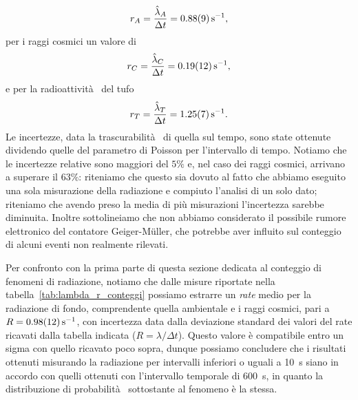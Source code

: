 \documentclass[10pt,oneside,a4paper]{article}
\begin{document}
\[
r_A = \frac{\hat{\lambda}_A}{\Delta t} = \SI{0.88 \pm 0.09}{s^{-1}},
\] 
per i raggi cosmici un valore di
\[
r_C = \frac{\hat{\lambda}_C}{\Delta t} = \SI{0.19 \pm 0.12}{s^{-1}},
\]
e per la radioattività  del tufo
\[
r_T = \frac{\hat{\lambda}_T}{\Delta t} = \SI{1.25 \pm 0.07}{s^{-1}}.
\]
Le incertezze, data la trascurabilità  di quella sul tempo, sono state ottenute dividendo quelle del parametro di Poisson per l'intervallo di tempo.
Notiamo che le incertezze relative sono maggiori del $5\%$ e, nel caso dei raggi cosmici, arrivano a superare il $63\%$: riteniamo che questo sia dovuto al fatto che abbiamo eseguito una sola misurazione della radiazione e compiuto l'analisi di un solo dato; riteniamo che avendo preso la media di più misurazioni l'incertezza sarebbe diminuita. Inoltre sottolineiamo che non abbiamo considerato il possibile rumore elettronico del contatore Geiger-M\"uller, che potrebbe aver influito sul conteggio di alcuni eventi non realmente rilevati.

Per confronto con la prima parte di questa sezione dedicata al conteggio di fenomeni di radiazione, notiamo che dalle misure riportate nella tabella~\ref{tab:lambda_r_conteggi} possiamo estrarre un \emph{rate} medio per la radiazione di fondo, comprendente quella ambientale e i raggi cosmici, pari a $R = \SI{0.98 \pm 0.12}{s^{-1}}$, con incertezza data dalla deviazione standard dei valori del rate ricavati dalla tabella indicata ($R = \lambda / \Delta t$). Questo valore è compatibile entro un sigma con quello ricavato poco sopra, dunque possiamo concludere che i risultati ottenuti misurando la radiazione per intervalli inferiori o uguali a \SI{10}{s} siano in accordo con quelli ottenuti con l'intervallo temporale di \SI{600}{s}, in quanto la distribuzione di probabilità  sottostante al fenomeno è la stessa.
\end{document}
